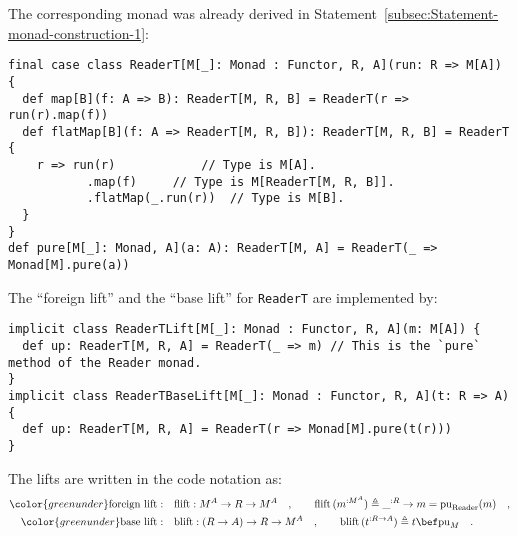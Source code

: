 The corresponding monad was already derived in Statement~\ref{subsec:Statement-monad-construction-1}:
\begin{lstlisting}
final case class ReaderT[M[_]: Monad : Functor, R, A](run: R => M[A]) {
  def map[B](f: A => B): ReaderT[M, R, B] = ReaderT(r => run(r).map(f))
  def flatMap[B](f: A => ReaderT[M, R, B]): ReaderT[M, R, B] = ReaderT {
    r => run(r)            // Type is M[A].
           .map(f)     // Type is M[ReaderT[M, R, B]].
           .flatMap(_.run(r))  // Type is M[B].
  }
}
def pure[M[_]: Monad, A](a: A): ReaderT[M, A] = ReaderT(_ => Monad[M].pure(a))
\end{lstlisting}
The \textsf{``}foreign lift\textsf{''} and the \textsf{``}base lift\textsf{''} for \lstinline!ReaderT!
are implemented by:
\begin{lstlisting}
implicit class ReaderTLift[M[_]: Monad : Functor, R, A](m: M[A]) {
  def up: ReaderT[M, R, A] = ReaderT(_ => m) // This is the `pure` method of the Reader monad.
}
implicit class ReaderTBaseLift[M[_]: Monad : Functor, R, A](t: R => A) {
  def up: ReaderT[M, R, A] = ReaderT(r => Monad[M].pure(t(r)))
}
\end{lstlisting}
The lifts are written in the code notation as:
\begin{align*}
{\color{greenunder}\text{foreign lift}:}\quad & \text{flift}:M^{A}\rightarrow R\rightarrow M^{A}\quad,\quad\quad\text{flift}\,(m^{:M^{A}})\triangleq\_^{:R}\rightarrow m=\text{pu}_{\text{Reader}}(m)\quad,\\
{\color{greenunder}\text{base lift}:}\quad & \text{blift}:(R\rightarrow A)\rightarrow R\rightarrow M^{A}\quad,\quad\quad\text{blift}\,(t^{:R\rightarrow A})\triangleq t\bef\text{pu}_{M}\quad.
\end{align*}

